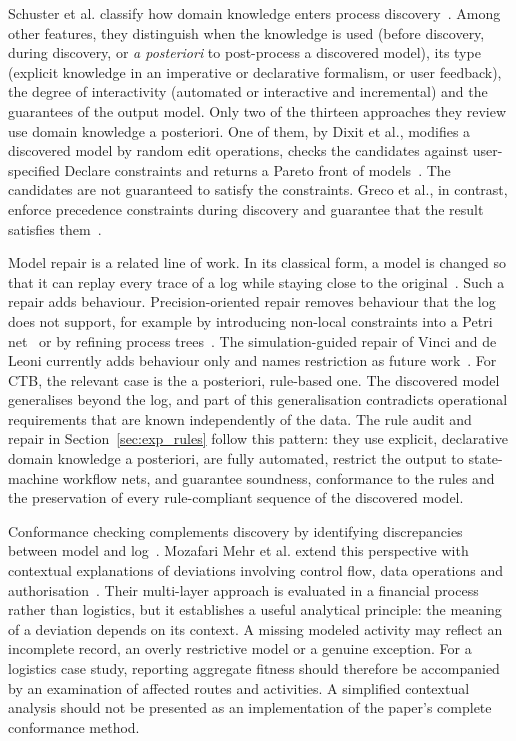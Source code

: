 Schuster et al. classify how domain knowledge enters process discovery~\cite{schuster2022}. Among other features, they distinguish when the knowledge is used (before discovery, during discovery, or \emph{a posteriori} to post-process a discovered model), its type (explicit knowledge in an imperative or declarative formalism, or user feedback), the degree of interactivity (automated or interactive and incremental) and the guarantees of the output model. Only two of the thirteen approaches they review use domain knowledge a posteriori. One of them, by Dixit et al., modifies a discovered model by random edit operations, checks the candidates against user-specified Declare constraints and returns a Pareto front of models~\cite{RWDixit2015Domain}. The candidates are not guaranteed to satisfy the constraints. Greco et al., in contrast, enforce precedence constraints during discovery and guarantee that the result satisfies them~\cite{RWGreco2015Precedence}.

Model repair is a related line of work. In its classical form, a model is changed so that it can replay every trace of a log while staying close to the original~\cite{RWFahland2015Repair,RWdeLeoni2022Enhancement}. Such a repair adds behaviour. Precision-oriented repair removes behaviour that the log does not support, for example by introducing non-local constraints into a Petri net~\cite{RWKalenkova2020NonLocal} or by refining process trees~\cite{RWRennert2024Precision}. The simulation-guided repair of Vinci and de Leoni currently adds behaviour only and names restriction as future work~\cite{SimulationGuidedRepair2025}. For CTB, the relevant case is the a posteriori, rule-based one. The discovered model generalises beyond the log, and part of this generalisation contradicts operational requirements that are known independently of the data. The rule audit and repair in Section~\ref{sec:exp_rules} follow this pattern: they use explicit, declarative domain knowledge a posteriori, are fully automated, restrict the output to state-machine workflow nets, and guarantee soundness, conformance to the rules and the preservation of every rule-compliant sequence of the discovered model.

Conformance checking complements discovery by identifying discrepancies between model and log~\cite{aalst2012ConformanceChecking}. Mozafari Mehr et al. extend this perspective with contextual explanations of deviations involving control flow, data operations and authorisation~\cite{RWMehr2023Explainable}. Their multi-layer approach is evaluated in a financial process rather than logistics, but it establishes a useful analytical principle: the meaning of a deviation depends on its context. A missing modeled activity may reflect an incomplete record, an overly restrictive model or a genuine exception. For a logistics case study, reporting aggregate fitness should therefore be accompanied by an examination of affected routes and activities. A simplified contextual analysis should not be presented as an implementation of the paper's complete conformance method.

